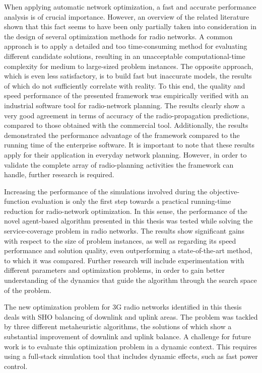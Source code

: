 When applying automatic network optimization, a fast and accurate
performance analysis is of crucial importance. However, an overview
of the related literature shown that this fact seems to have been
only partially taken into consideration in the design of several optimization
methods for radio networks. A common approach is to apply a detailed
and too time-consuming method for evaluating different candidate solutions,
resulting in an unacceptable computational-time complexity for medium
to large-sized problem instances. The opposite approach, which is
even less satisfactory, is to build fast but inaccurate models, the
results of which do not sufficiently correlate with reality. To this
end, the quality and speed performance of the presented framework
was empirically verified with an industrial software tool for radio-network
planning. The results clearly show a very good agreement in terms
of accuracy of the radio-propagation predictions, compared to those
obtained with the commercial tool. Additionally, the results demonstrated
the performance advantage of the framework compared to the running
time of the enterprise software. It is important to note that these
results apply for their application in everyday network planning.
However, in order to validate the complete array of radio-planning
activities the framework can handle, further research is required.

Increasing the performance of the simulations involved during the
objective-function evaluation is only the first step towards a practical
running-time reduction for radio-network optimization. In this sense,
the performance of the novel agent-based algorithm presented in this
thesis was tested while solving the service-coverage problem in radio
networks. The results show significant gains with respect to the size
of problem instances, as well as regarding its speed performance and
solution quality, even outperforming a state-of-the-art method, to
which it was compared. Further research will include experimentation
with different parameters and optimization problems, in order to gain
better understanding of the dynamics that guide the algorithm through
the search space of the problem.

The new optimization problem for 3G radio networks identified in this
thesis deals with SHO balancing of downlink and uplink areas. The
problem was tackled by three different metaheuristic algorithms, the
solutions of which show a substantial improvement of downlink and
uplink balance. A challenge for future work is to evaluate this optimization
problem in a dynamic context. This requires using a full-stack simulation
tool that includes dynamic effects, such as fast power control.

